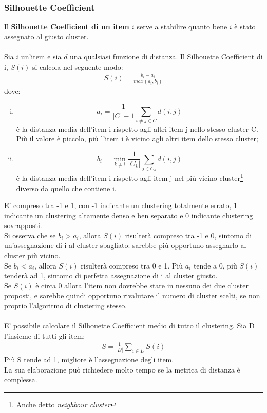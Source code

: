 \subsubsection{Silhouette Coefficient}
Il \textbf{Silhouette Coefficient di un item $i$} serve a stabilire quanto bene $i$ è stato assegnato al giusto cluster.\\
\\
Sia $i$ un'item e sia $d$ una qualsiasi funzione di distanza. Il Silhouette Coefficient di i, $S(i)$ si calcola nel seguente modo:
\begin{align}
	S(i) = \frac{b_i - a_i}{max(a_i, b_i)}
\end{align}
dove:
\begin{enumerate}[(i)]
	\item $$ a_i = \frac{1}{|C|-1}\sum_{i\ne j\in C} d(i,j)$$ è la distanza media dell'item i rispetto agli altri item j nello stesso cluster C.\\
	Più il valore è piccolo, più l'item i è vicino agli altri item dello stesso cluster;
	\item $$ b_i = \min_{k\ne i} \frac{1}{|C_k|}\sum_{j \in C_k} d(i,j)$$ è la distanza media dell'item i rispetto agli item j nel più vicino cluster\footnote{Anche detto \textit{neighbour cluster}} diverso da quello che contiene i.
\end{enumerate}
E' compreso tra -1 e 1, con -1 indicante un clustering totalmente errato, 1 indicante un clustering altamente denso e ben separato e 0 indicante clustering sovrapposti.\\
Si osserva che se $b_i > a_i$, allora $S(i)$ risulterà compreso tra -1 e 0, sintomo di un'assegnazione di i al cluster sbagliato: sarebbe più opportuno assegnarlo al cluster più vicino.\\
Se $b_i < a_i$, allora $S(i)$ risulterà compreso tra 0 e 1. Più $a_i$ tende a 0, più $S(i)$ tenderà ad 1, sintomo di perfetta assegnazione di i al cluster giusto.\\
Se $S(i)$ è circa 0 allora l'item non dovrebbe stare in nessuno dei due cluster proposti, e sarebbe quindi opportuno rivalutare il numero di cluster scelti, se non proprio l'algoritmo di clustering stesso.\\
\\
E' possibile calcolare il Silhouette Coefficient medio di tutto il clustering. Sia D l'insieme di tutti gli item:
\begin{align}
	S = \frac{1}{|D|} \sum_{i \in D} S(i)
\end{align}
Più S tende ad 1, migliore è l'assegnazione degli item.\\
La sua elaborazione può richiedere molto tempo se la metrica di distanza è complessa.

